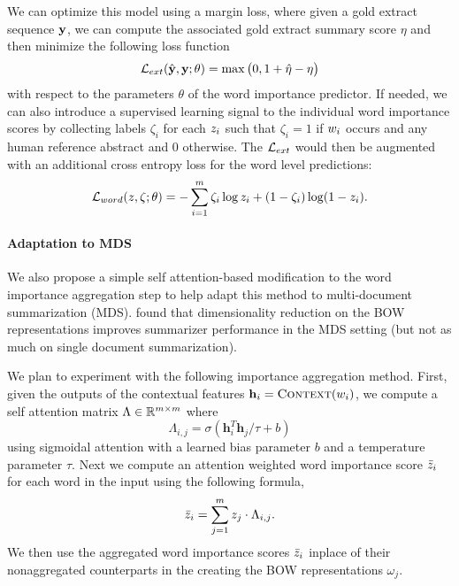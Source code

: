         We can optimize this model using a margin loss, where given a 
        gold extract sequence  $\mathbf{y}$, we can compute the associated
        gold extract summary score $\eta$ and then minimize the following
        loss function \[\mathcal{L}_{ext}(\hat{\mathbf{y}}, \mathbf{y};\theta) = \max\big(0, 1 + \hat{\eta} - \eta\big)\]
        with respect to the parameters $\theta$ of the word importance 
        predictor.
        If needed, we can also introduce a supervised learning signal to the 
        individual word importance scores by collecting labels $\zeta_i$ for
        each $z_i$ such that $\zeta_i = 1$ if $w_i$ occurs
        and any human reference abstract and $0$ otherwise. The 
        $\mathcal{L}_{ext}$ would then be augmented with an additional cross
        entropy loss for the word level predictions:
        \[ \mathcal{L}_{word}(z, \zeta; \theta) = -\sum_{i=1}^m \zeta_i \log z_i + (1 - \zeta_i) \log (1 - z_i). \] 




        \paragraph{Adaptation to MDS} We also propose a simple 
        self attention-based modification to
        the word importance aggregation step to help adapt this method
        to multi-document summarization (MDS). \cite{conroy2013multilingual} 
        found
        that dimensionality reduction on the BOW representations improves
        summarizer performance in the MDS setting (but not as much on
 single document
        summarization). 


        We plan to experiment with the following importance 
        aggregation method. First, given the outputs of the contextual features
        $\mathbf{h}_i = \textsc{Context}(w_i)$, 
        we compute a self attention matrix $\Lambda \in \mathbb{R}^{m\times m}$
        where \[\Lambda_{i,j} = \sigma(\mathbf{h}_i^T \mathbf{h}_j / \tau + b)  \]
        using sigmoidal attention \citep{kim2017structured} with a learned bias 
        parameter $b$ and a temperature parameter $\tau$.
        Next we compute an attention weighted word importance score $\bar{z}_i$ for each word in the input using the following formula,
        \[ \bar{z}_i = \sum_{j=1}^m z_j \cdot \Lambda_{i,j}.\]
        We then use the aggregated word importance scores 
    $\bar{z}_i$ inplace of their nonaggregated counterparts
        in the creating the BOW representations $\omega_j$.

